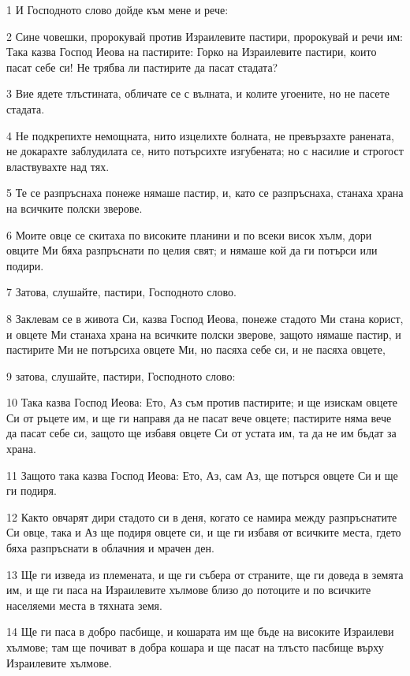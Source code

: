 \par 1 И Господното слово дойде към мене и рече:
\par 2 Сине човешки, пророкувай против Израилевите пастири, пророкувай и речи им: Така казва Господ Иеова на пастирите: Горко на Израилевите пастири, които пасат себе си! Не трябва ли пастирите да пасат стадата?
\par 3 Вие ядете тлъстината, обличате се с вълната, и колите угоените, но не пасете стадата.
\par 4 Не подкрепихте немощната, нито изцелихте болната, не превързахте ранената, не докарахте заблудилата се, нито потърсихте изгубената; но с насилие и строгост властвувахте над тях.
\par 5 Те се разпръснаха понеже нямаше пастир, и, като се разпръснаха, станаха храна на всичките полски зверове.
\par 6 Моите овце се скитаха по високите планини и по всеки висок хълм, дори овците Ми бяха разпръснати по целия свят; и нямаше кой да ги потърси или подири.
\par 7 Затова, слушайте, пастири, Господното слово.
\par 8 Заклевам се в живота Си, казва Господ Иеова, понеже стадото Ми стана корист, и овцете Ми станаха храна на всичките полски зверове, защото нямаше пастир, и пастирите Ми не потърсиха овцете Ми, но пасяха себе си, и не пасяха овцете,
\par 9 затова, слушайте, пастири, Господното слово:
\par 10 Така казва Господ Иеова: Ето, Аз съм против пастирите; и ще изискам овцете Си от ръцете им, и ще ги направя да не пасат вече овцете; пастирите няма вече да пасат себе си, защото ще избавя овцете Си от устата им, та да не им бъдат за храна.
\par 11 Защото така казва Господ Иеова: Ето, Аз, сам Аз, ще потърся овцете Си и ще ги подиря.
\par 12 Както овчарят дири стадото си в деня, когато се намира между разпръснатите Си овце, така и Аз ще подиря овцете си, и ще ги избавя от всичките места, гдето бяха разпръснати в облачния и мрачен ден.
\par 13 Ще ги изведа из племената, и ще ги събера от страните, ще ги доведа в земята им, и ще ги паса на Израилевите хълмове близо до потоците и по всичките населяеми места в тяхната земя.
\par 14 Ще ги паса в добро пасбище, и кошарата им ще бъде на високите Израилеви хълмове; там ще почиват в добра кошара и ще пасат на тлъсто пасбище върху Израилевите хълмове.
